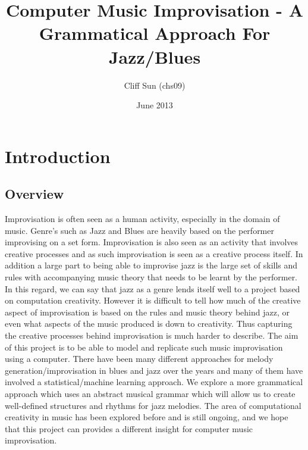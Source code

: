 \documentclass[pdftex,12pt,a4paper]{report}
\begin{document}
\title{Computer Music Improvisation - A Grammatical Approach For Jazz/Blues}
\author{Cliff Sun (chs09)}
\date{June 2013}
\maketitle


\setcounter{tocdepth}{2} %

\tableofcontents

\pagebreak

\renewcommand*\thesection{\arabic{section}}



\pagebreak

\chapter{Introduction}

\section{Overview}
Improvisation is often seen as a human activity, especially in the domain of music. Genre's such as Jazz and Blues are heavily based on the performer improvising on a set form. Improvisation is also seen as an activity that involves creative processes and as such improvisation is seen as a creative process itself. In addition a large part to being able to improvise jazz is the large set of skills and rules with accompanying music theory that needs to be learnt by the performer. In this regard, we can say that jazz as a genre lends itself well to a project based on computation creativity. However it is difficult to tell how much of the creative aspect of improvisation is based on the rules and music theory behind jazz, or even what aspects of the music produced is down to creativity. Thus capturing the creative processes behind improvisation is much harder to describe. The aim of this project is to be able to model and replicate such music improvisation using a computer. There have been many different approaches for melody generation/improvisation in blues and jazz over the years and many of them have involved a statistical/machine learning approach. We explore a more grammatical approach which uses an abstract musical grammar which will allow us to create well-defined structures and rhythms for jazz melodies. The area of computational creativity in music has been explored before and is still ongoing, and we hope that this project can provides a different insight for computer music improvisation. 
\end{document}
